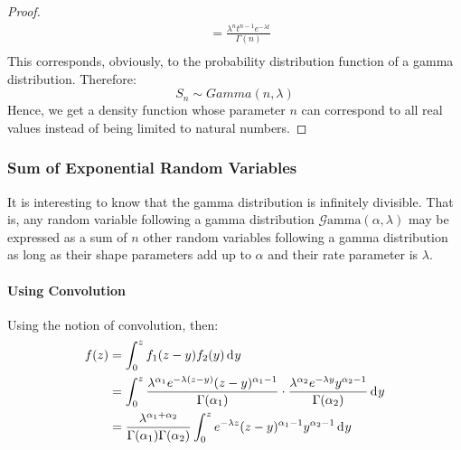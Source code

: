 \documentclass[12pt]{article}
\newcommand{\G}{\mathcal{G}}
\begin{document}
\begin{proof}
\begin{equation}
\begin{split}
						&=	\frac{\lambda^n t^{n-1} e^{-\lambda t}}{\Gamma(n)}\\
		\end{split}
	\end{equation}
	This corresponds, obviously, to the probability distribution function of a gamma distribution. Therefore:
	\begin{equation}
		S_n \sim Gamma(n, \lambda)
	\end{equation}
	Hence, we get a density function whose parameter $n$ can correspond to all real values instead of being limited to
	natural numbers.
\end{proof}


\pagebreak
\subsubsection{Sum of Exponential Random Variables}
It is interesting to know that the gamma distribution is infinitely divisible. That is, any random variable following a
gamma distribution $\G\text{amma}(\alpha, \lambda)$ may be expressed as a sum of $n$ other random variables following a
gamma distribution as long as their shape parameters add up to $\alpha$ and their rate parameter is $\lambda$.
\paragraph{Using Convolution}
Using the notion of convolution, then:
\begin{equation}
	\begin{split}
		f(z)	&=	\int_{0}^{z} f_1 (z-y) f_2 (y) \mathop{}\!\mathrm{d^{}}y\\
				&=	\int_{0}^{z}\frac{\lambda^{\alpha_1} e^{-\lambda(z-y)} (z-y)^{\alpha_1 -1}}{\Gamma(\alpha_1)} \cdot \frac{\lambda^{\alpha_2} e^{-\lambda y}y^{\alpha_2 -1}}{\Gamma(\alpha_2)}\mathop{}\!\mathrm{d^{}}y\\
				&=	\frac{\lambda^{\alpha_1+\alpha_2}}{\Gamma(\alpha_1) \Gamma(\alpha_2)}\int_{0}^{z}e^{-\lambda z}(z-y)^{\alpha_1 -1}y^{\alpha_2 -1}\mathop{}\!\mathrm{d^{}}y\\
	\end{split}
\end{equation}
\end{document}
